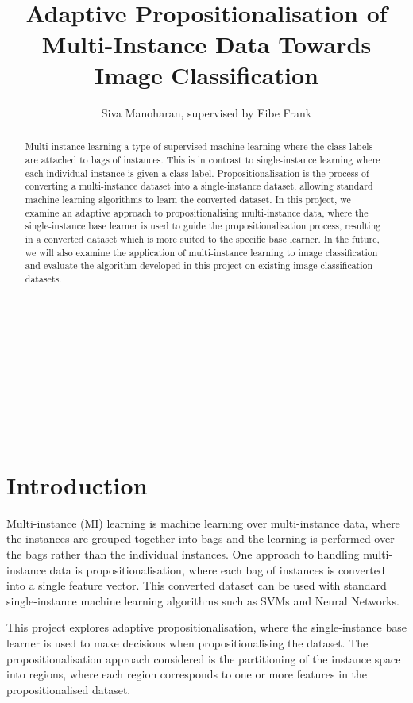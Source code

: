 \documentclass[a4paper,12pt]{article} %
\title{\ \\ \  \\ Adaptive Propositionalisation of Multi-Instance Data Towards Image Classification}
\author{Siva Manoharan, supervised by Eibe Frank}
\begin{document}
\onehalfspacing
{}  %

\maketitle 
\ \\ \ \\ \ \\ \ \\ \ \\ \ \\ \ %
\begin{abstract}
Multi-instance learning a type of supervised machine learning 
    where the class labels are attached to bags of instances. 
This is in contrast to single-instance learning 
    where each individual instance is given a class label.
Propositionalisation is the process of 
    converting a multi-instance dataset into a single-instance dataset, 
    allowing standard machine learning algorithms to learn the converted dataset. 
In this project, 
    we examine an adaptive approach to propositionalising multi-instance data, 
    where the single-instance base learner is 
    used to guide the propositionalisation process, 
    resulting in a converted dataset 
    which is more suited to the specific base learner.
In the future, 
    we will also examine the application of multi-instance learning 
    to image classification and 
    evaluate the algorithm developed in this project 
    on existing image classification datasets.
\end{abstract}

\thispagestyle{empty}
\clearpage
{}  

\section{Introduction} 

Multi-instance (MI) learning is 
    machine learning over multi-instance data, 
    where the instances are grouped together into bags and 
    the learning is performed over the bags 
    rather than the individual instances. 
One approach to handling multi-instance data is propositionalisation, 
    where each bag of instances is converted into 
    a single feature vector. 
This converted dataset can be used with 
    standard single-instance machine learning algorithms 
    such as SVMs and Neural Networks.

This project explores adaptive propositionalisation, 
    where the single-instance base learner is used to 
    make decisions when propositionalising the dataset. 
The propositionalisation approach considered is the 
    partitioning of the instance space into regions, 
    where each region corresponds to 
    one or more features in the propositionalised dataset.
\end{document}
